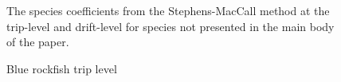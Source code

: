 \documentclass[
  12pt,
  authoryear,
  preprint,
  3p]{elsarticle}
\begin{document}
\begin{figure}
\begin{minipage}[t]{0.50\linewidth}
{{}

}

\end{minipage}%

\caption{\label{fig-sm3}The species coefficients from the
Stephens-MacCall method at the trip-level and drift-level for species
not presented in the main body of the paper.}

\end{figure}

\begin{figure}

\begin{minipage}[t]{0.50\linewidth}

{\centering 


\caption{\label{fig-blue-tripsm}Blue rockfish trip level}

}

\end{minipage}%
%
\begin{minipage}[t]{0.50\linewidth}

{\centering 

}
\end{minipage}
\end{figure}
\end{document}
